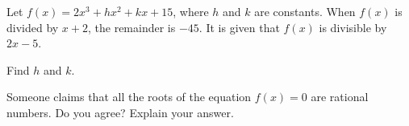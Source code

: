 
Let $f(x) = 2x^3 + hx^2 + kx + 15$, where $h$ and $k$ are constants. When $f(x)$ is divided by $x+2$, the remainder is $-45$. It is given that $f(x)$ is divisible by $2x-5$.

\begin{enumx}[label=(\alph*)]
\item Find $h$ and $k$.

\item Someone claims that all the roots of the equation $f(x)=0$ are rational numbers. Do you agree? Explain your answer.

\end{enumx}





